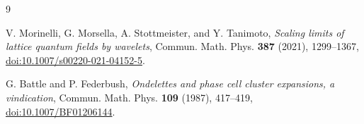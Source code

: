 \documentclass[11pt,a4paper]{article}
\begin{document}
\begin{thebibliography}{9}

V. Morinelli, G. Morsella, A. Stottmeister, and Y. Tanimoto,
\emph{Scaling limits of lattice quantum fields by wavelets},
Commun. Math. Phys. \textbf{387} (2021), 1299--1367,
\href{https://doi.org/10.1007/s00220-021-04152-5}{doi:10.1007/s00220-021-04152-5}.

G. Battle and P. Federbush,
\emph{Ondelettes and phase cell cluster expansions, a vindication},
Commun. Math. Phys. \textbf{109} (1987), 417--419,
\href{https://doi.org/10.1007/BF01206144}{doi:10.1007/BF01206144}.

\end{thebibliography}
\end{document}
